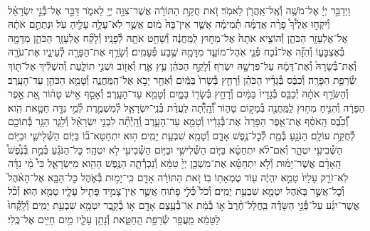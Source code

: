 \documentclass[twoside, openany, parskip=half, 11pt]{book}
\begin{document}
\begin{footnotesize}
\begin{multicols}{2}
\\
וַיְדַבֵּ֣ר יְיָ֔ אֶל־מֹשֶׁ֥ה וְ֯אֶֽל־אַֽהֲרֹ֖ן לֵאמֹֽר׃ זֹ֚את חֻקַּ֣ת הַתּוֹרָ֔ה אֲשֶׁר־צִוָּ֥ה יְיָ֖ לֵאמֹ֑ר דַּבֵּ֣ר אֶל־בְּ֯נֵ֣י יִשְׂרָאֵ֗ל וְ֯יִקְח֣וּ אֵלֶ֩יךָ֩ פָרָ֨ה אֲדֻמָּ֜ה תְּ֯מִימָ֗ה אֲשֶׁ֤ר אֵין־בָּהּ֙ מ֔וּם אֲשֶׁ֛ר לֹֽא־עָלָ֥ה עָלֶ֖יהָ עֹֽל׃ וּנְתַתֶּ֣ם אֹתָ֔הּ אֶל־אֶלְעָזָ֖ר הַכֹּהֵ֑ן וְ֯הוֹצִ֤יא אֹתָהּ֙ אֶל־מִח֣וּץ לַֽמַּֽחֲנֶ֔ה וְ֯שָׁחַ֥ט אֹתָ֖הּ לְ֯פָנָֽיו׃ וְ֯לָקַ֞ח אֶלְעָזָ֧ר הַכֹּהֵ֛ן מִדָּמָ֖הּ בְּ֯אֶצְבָּע֑וֹ וְ֯הִזָּ֞ה אֶל־נֹ֨כַח פְּ֯נֵ֧י אֹֽהֶל־מוֹעֵ֛ד מִדָּמָ֖הּ שֶׁ֥בַע פְּ֯עָמִֽים׃ וְ֯שָׂרַ֥ף אֶת־הַפָּרָ֖ה לְ֯עֵינָ֑יו אֶת־עֹרָ֤הּ וְ֯אֶת־בְּ֯שָׂרָהּ֙ וְ֯אֶת־דָּמָ֔הּ עַל־פִּרְשָׁ֖הּ יִשְׂרֹֽף׃ וְ֯לָקַ֣ח הַכֹּהֵ֗ן עֵ֥ץ אֶ֛רֶז וְ֯אֵז֖וֹב וּשְׁנִ֣י תוֹלָ֑עַת וְ֯הִשְׁלִ֕יךְ אֶל־תּ֖וֹךְ שְׂ֯רֵפַ֥ת הַפָּרָֽה׃  וְ֯כִבֶּ֨ס בְּ֯גָדָ֜יו הַכֹּהֵ֗ן וְ֯רָחַ֤ץ בְּ֯שָׂרוֹ֙ בַּמַּ֔יִם וְ֯אַחַ֖ר יָבֹ֣א אֶל־הַֽמַּֽחֲנֶ֑ה וְ֯טָמֵ֥א הַכֹּהֵ֖ן עַד־הָעָֽרֶב׃ וְ֯הַשֹּׂרֵ֣ף אֹתָ֔הּ יְ֯כַבֵּ֤ס בְּ֯גָדָיו֙ בַּמַּ֔יִם וְ֯רָחַ֥ץ בְּ֯שָׂר֖וֹ בַּמָּ֑יִם וְ֯טָמֵ֖א עַד־הָעָֽרֶב׃ וְ֯אָסַ֣ף אִ֣ישׁ טָה֗וֹר אֵ֚ת אֵ֣פֶר הַפָּרָ֔ה וְ֯הִנִּ֛יחַ מִח֥וּץ לַֽמַּֽחֲנֶ֖ה בְּ֯מָק֣וֹם טָה֑וֹר וְֽ֠֯הָֽיְ֯תָ֠ה לַֽעֲדַ֨ת בְּ֯נֵֽי־יִשְׂרָאֵ֧ל לְ֯מִשְׁמֶ֛רֶת לְ֯מֵ֥י נִדָּ֖ה חַטָּ֥את הִֽוא׃
וְ֠֯כִבֶּ֠ס הָֽאֹסֵ֨ף אֶת־אֵ֤פֶר הַפָּרָה֙ אֶת־בְּ֯גָדָ֔יו וְ֯טָמֵ֖א עַד־הָעָ֑רֶב וְֽ֯הָֽיְ֯תָ֞ה לִבְנֵ֣י יִשְׂרָאֵ֗ל וְ֯לַגֵּ֛ר הַגָּ֥ר בְּ֯תוֹכָ֖ם לְ֯חֻקַּ֥ת עוֹלָֽם׃
הַנֹּגֵ֥עַ בְּ֯מֵ֖ת לְ֯כׇל־נֶ֣פֶשׁ אָדָ֑ם וְ֯טָמֵ֖א שִׁבְעַ֥ת יָמִֽים׃ ה֣וּא יִתְחַטָּא־ב֞וֹ בַּיּ֧וֹם הַשְּׁ֯לִישִׁ֛י וּבַיּ֥וֹם הַשְּׁ֯בִיעִ֖י יִטְהָ֑ר וְ֯אִם־לֹ֨א יִתְחַטָּ֜א בַּיּ֧וֹם הַשְּׁ֯לִישִׁ֛י וּבַיּ֥וֹם הַשְּׁ֯בִיעִ֖י לֹ֥א יִטְהָֽר׃ כׇּל־הַנֹּגֵ֡עַ בְּ֯מֵ֣ת בְּ֯נֶ֩פֶשׁ֩ הָֽאָדָ֨ם אֲשֶׁר־יָמ֜וּת וְ֯לֹ֣א יִתְחַטָּ֗א אֶת־מִשְׁכַּ֤ן יְיָ֙ טִמֵּ֔א וְ֯נִכְרְ֯תָ֛ה הַנֶּ֥פֶשׁ הַהִ֖וא מִיִּשְׂרָאֵ֑ל כִּי֩ מֵ֨י נִדָּ֜ה לֹֽא־זֹרַ֤ק עָלָיו֙ טָמֵ֣א יִֽהְיֶ֔ה ע֖וֹד טֻמְאָת֥וֹ בֽוֹ׃ זֹ֚את הַתּוֹרָ֔ה אָדָ֖ם כִּֽי־יָמ֣וּת בְּ֯אֹ֑הֶל כׇּל־הַבָּ֤א אֶל־הָאֹ֨הֶל֙ וְ֯כׇל־אֲשֶׁ֣ר בָּאֹ֔הֶל יִטְמָ֖א שִׁבְעַ֥ת יָמִֽים׃ וְ֯כֹל֙ כְּ֯לִ֣י פָת֔וּחַ אֲשֶׁ֛ר אֵין־צָמִ֥יד פָּתִ֖יל עָלָ֑יו טָמֵ֖א הֽוּא׃ וְ֯כֹ֨ל אֲשֶׁר־יִגַּ֜ע עַל־פְּ֯נֵ֣י הַשָּׂדֶ֗ה בַּֽחֲלַל־חֶ֨רֶב֙ א֣וֹ בְ֯מֵ֔ת אֽוֹ־בְ֯עֶ֥צֶם אָדָ֖ם א֣וֹ בְ֯קָ֑בֶר יִטְמָ֖א שִׁבְעַ֥ת יָמִֽים׃ וְ֯לָֽקְ֯חוּ֙ לַטָּמֵ֔א מֵֽעֲפַ֖ר שְׂ֯רֵפַ֣ת הַֽחַטָּ֑את וְ֯נָתַ֥ן עָלָ֛יו מַ֥יִם חַיִּ֖ים אֶל־כֶּֽלִי׃


\end{multicols}
\end{footnotesize}
\end{document}
